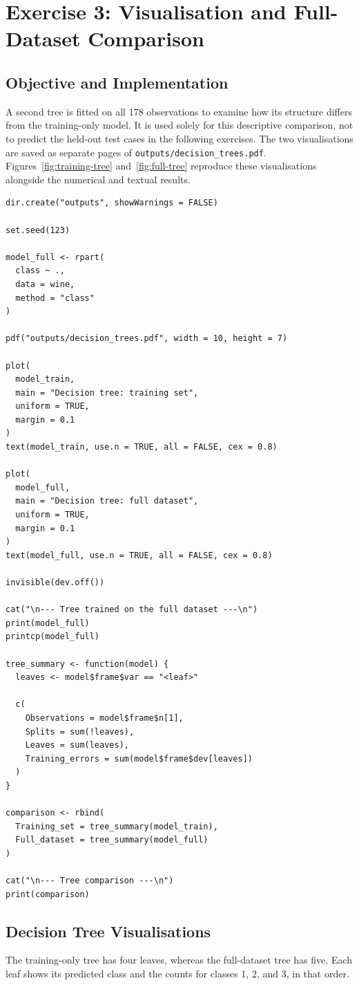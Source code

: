 \documentclass[11pt,a4paper]{article}
\begin{document}
\section{Exercise 3: Visualisation and Full-Dataset Comparison}
\subsection{Objective and Implementation}
A second tree is fitted on all 178 observations to examine how its structure differs from the training-only model. It is used solely for this descriptive comparison, not to predict the held-out test cases in the following exercises. The two visualisations are saved as separate pages of \texttt{outputs/decision\_trees.pdf}. Figures~\ref{fig:training-tree} and~\ref{fig:full-tree} reproduce these visualisations alongside the numerical and textual results.
\begin{lstlisting}
dir.create("outputs", showWarnings = FALSE)

set.seed(123)

model_full <- rpart(
  class ~ .,
  data = wine,
  method = "class"
)

pdf("outputs/decision_trees.pdf", width = 10, height = 7)

plot(
  model_train,
  main = "Decision tree: training set",
  uniform = TRUE,
  margin = 0.1
)
text(model_train, use.n = TRUE, all = FALSE, cex = 0.8)

plot(
  model_full,
  main = "Decision tree: full dataset",
  uniform = TRUE,
  margin = 0.1
)
text(model_full, use.n = TRUE, all = FALSE, cex = 0.8)

invisible(dev.off())

cat("\n--- Tree trained on the full dataset ---\n")
print(model_full)
printcp(model_full)

tree_summary <- function(model) {
  leaves <- model$frame$var == "<leaf>"

  c(
    Observations = model$frame$n[1],
    Splits = sum(!leaves),
    Leaves = sum(leaves),
    Training_errors = sum(model$frame$dev[leaves])
  )
}

comparison <- rbind(
  Training_set = tree_summary(model_train),
  Full_dataset = tree_summary(model_full)
)

cat("\n--- Tree comparison ---\n")
print(comparison)
\end{lstlisting}

\clearpage
\subsection{Decision Tree Visualisations}
The training-only tree has four leaves, whereas the full-dataset tree has five. Each leaf shows its predicted class and the counts for classes 1, 2, and 3, in that order.
\end{document}
